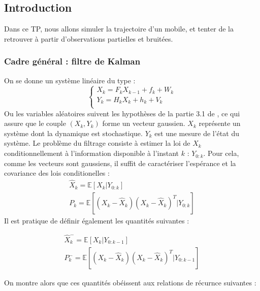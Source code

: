 \documentclass{article}
\begin{document}
\subsection{Introduction}
Dans ce TP, nous allons simuler la trajectoire d'un mobile, et tenter de la retrouver à partir d'observations partielles et bruitées.

\subsubsection{Cadre général : filtre de Kalman}
On se donne un système linéaire du type :
\begin{equation*}
   \left\{
   \begin{array}{c}
      X_{k}=F_{k}X_{k-1}+f_{k}+W_{k} \\
      Y_{k}=H_{k}X_{k}+h_{k}+V_{k} \\
   \end{array}
   \right.
\end{equation*}
Ou les variables aléatoires suivent les hypothèses de la partie 3.1 de \cite{legland2008filtrage}, ce qui assure que 
le couple $(X_k,Y_k)$ forme un vecteur gaussien.
$X_k$ représente un système dont la dynamique est stochastique. $Y_k$ est une mesure de l'état du 
système. Le problème du filtrage consiste à estimer la loi de $X_k$ conditionnellement à l'information
disponible à l'instant $k$ : $Y_{0:k}$. Pour cela, comme les vecteurs sont gaussiens, il suffit de caractériser l'espérance et la covariance des lois conditionelles : 
\begin{equation*}
   \begin{array}{c}
      \hat{X}_{k}= \mathbb{E}[X_{k}| Y_{0:k}]\\
      P_k = \mathbb{E}\left[\left(X_k-\hat{X}_k\right)\left(X_k-\hat{X}_k\right)^{T}| Y_{0:k}\right]
   \end{array}
\end{equation*}
Il est pratique de définir également les quantités suivantes : 

\begin{equation*}
   \begin{array}{c}
      \hat{X}_{k}^{-}= \mathbb{E}[X_{k}| Y_{0:k-1}]\\
      P_k^{-} = \mathbb{E}\left[\left(X_k-\hat{X}_k\right)\left(X_k-\hat{X}_k\right)^{T}| Y_{0:k-1}\right]
   \end{array}
\end{equation*}

On montre alors que ces quantités obéissent aux relations de récurnce suivantes : 
\end{document}
